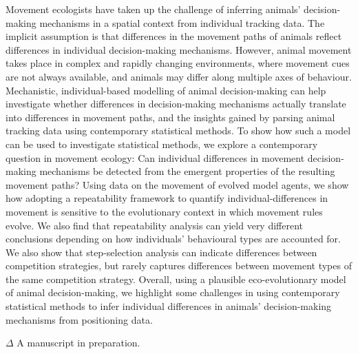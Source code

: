     Movement ecologists have taken up the challenge of inferring animals' decision-making mechanisms in a spatial context from individual tracking data.
    The implicit assumption is that differences in the movement paths of animals reflect differences in individual decision-making mechanisms.
    However, animal movement takes place in complex and rapidly changing environments, where movement cues are not always available, and animals may differ along multiple axes of behaviour.
    Mechanistic, individual-based modelling of animal decision-making can help investigate whether differences in decision-making mechanisms actually translate into differences in movement paths, and the insights gained by parsing animal tracking data using contemporary statistical methods.
    To show how such a model can be used to investigate statistical methods, we explore a contemporary question in movement ecology: Can individual differences in movement decision-making mechanisms be detected from the emergent properties of the resulting movement paths?
    Using data on the movement of evolved model agents, we show how adopting a repeatability framework to quantify individual-differences in movement is sensitive to the evolutionary context in which movement rules evolve.
    We also find that repeatability analysis can yield very different conclusions depending on how individuals' behavioural types are accounted for.
    We also show that step-selection analysis can indicate differences between competition strategies, but rarely captures differences between movement types of the same competition strategy.
    Overall, using a plausible eco-evolutionary model of animal decision-making, we highlight some challenges in using contemporary statistical methods to infer individual differences in animals' decision-making mechanisms from positioning data.

    \bigskip

    {\noindent \large{$\Delta$}} A manuscript in preparation.

\clearpage
